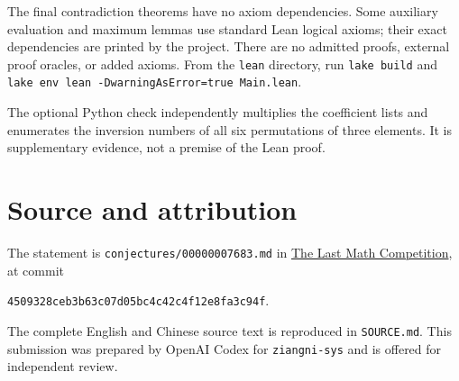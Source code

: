 \documentclass[11pt]{article}
\begin{document}
The final contradiction theorems have no axiom dependencies. Some auxiliary
evaluation and maximum lemmas use standard Lean logical axioms; their exact
dependencies are printed by the project. There are no admitted proofs,
external proof oracles, or added axioms. From the \texttt{lean} directory,
run \texttt{lake build} and
\texttt{lake env lean -DwarningAsError=true Main.lean}.

The optional Python check independently multiplies the coefficient lists
and enumerates the inversion numbers of all six permutations of three
elements. It is supplementary evidence, not a premise of the Lean proof.

\section{Source and attribution}
The statement is \texttt{conjectures/00000007683.md} in
\href{https://github.com/The-Last-Math-Competition/The-Last-Math-Competition}
{The Last Math Competition}, at commit
\begin{center}
\small\texttt{4509328ceb3b63c07d05bc4c42c4f12e8fa3c94f}.
\end{center}
The complete English and Chinese source text is reproduced in
\texttt{SOURCE.md}. This submission was prepared by OpenAI Codex for
\texttt{ziangni-sys} and is offered for independent review.
\end{document}
